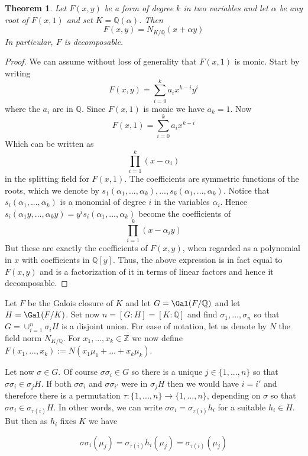 \documentclass{article}
\newtheorem{theorem}{Theorem}[section]
\newcommand{\mbb}[1]{\mathbb{#1}}
\begin{document}
\begin{theorem}\label{thm: Forms in two variables are decomposable}
    Let $F(x, y)$ be a form of degree $k$ in two variables and let $\alpha$ be any root of $F(x, 1)$ and set $K = \mbb Q(\alpha)$. Then 
    $$F(x, y) = N_{K / \mbb Q}(x + \alpha y)$$ 
    In particular, $F$ is decomposable.
\end{theorem}
\begin{proof}
    We can assume without loss of generality that $F(x, 1)$ is monic. Start by writing
    $$F(x, y) = \sum_{i=0}^k a_i x^{k-i} y^i$$
    where the $a_i$ are in $\mbb{Q}$. Since $F(x, 1)$ is monic we have $a_k = 1$. Now 
    $$F(x, 1) = \sum_{i=0}^k a_i x^{k-i}$$
    Which can be written as
    $$\prod_{i=1}^k (x - \alpha_i)$$
    in the splitting field for $F(x,1)$. The coefficients are symmetric functions of the roots, which we denote by $s_1(\alpha_1, ..., \alpha_k), ..., s_k(\alpha_1, ..., \alpha_k)$. Notice that $s_i(\alpha_1, ..., \alpha_k)$ is a monomial of degree $i$ in the variables $\alpha_i$. Hence $s_i(\alpha_1y, ..., \alpha_k y) = y^i s_i(\alpha_1, ..., \alpha_k)$ become the coefficients of 
    $$\prod_{i=1}^k (x - \alpha_iy)$$
    But these are exactly the coefficients of $F(x,y)$, when regarded as a polynomial in $x$ with coefficients in $\mbb{Q}[y]$. Thus, the above expression is in fact equal to $F(x,y)$ and is a factorization of it in terms of linear factors and hence it decomposable.
\end{proof}


Let $F$ be the Galois closure of $K$ and let $G = \Gal(F / \mbb Q)$ and let $H = \Gal(F / K)$. Set now $n = [G : H] = [K : \mbb Q ]$ and find $\sigma_1, ..., \sigma_n$ so that
$G = \cup_{i=1}^n \sigma_i H$
is a disjoint union. For ease of notation, let us denote by $N$ the field norm $N_{K/\mbb Q}$. For $x_1, ..., x_k \in \mbb Z$ we now define $F(x_1, ..., x_k) := N(x_1 \mu_1 + ... + x_k \mu_k)$. 

Let now $\sigma \in G$. Of course $\sigma \sigma_i \in G$ so there is a unique $j \in \{1, ..., n\}$ so that $\sigma \sigma_i \in \sigma_j H$. If both $\sigma \sigma_i$ and $\sigma \sigma_{i'}$ were in $\sigma_j H$ then we would have $i = i'$ and therefore there is a permutation $\tau : \{1, ..., n\} \to \{1, ..., n\}$, depending on $\sigma$ so that $\sigma \sigma_i \in \sigma_{\tau(i)} H$. In other words, we can write $\sigma \sigma_i = \sigma_{\tau(i)}h_i$ for a suitable $h_i \in H$. But then as $h_i$ fixes $K$ we have 

$$\sigma \sigma_i(\mu_j) = \sigma_{\tau(i)}h_i(\mu_j) = \sigma_{\tau(i)}(\mu_j)$$
\end{document}
